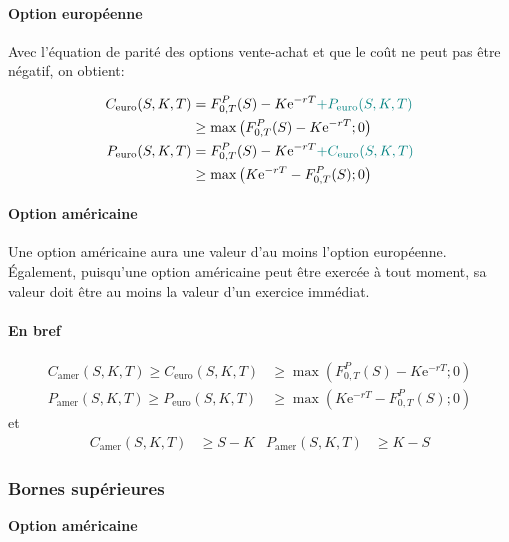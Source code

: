 \documentclass[10pt, french]{article}
\begin{document}
\begin{multicols*}{2}
\paragraph{Option européenne}	Avec l'équation de parité des options vente-achat et que le coût ne peut pas être négatif, on obtient:

\begin{align*}
	C_{\text{euro}}(S, K, T)	
	&=	F_{0, T}^{P}(S) - K\textrm{e}^{-rT} \textcolor{teal}{+ P_{\text{euro}}(S, K, T)}	\\
	&\geq	\max\left(F_{0, T}^{P}(S) - K\textrm{e}^{-rT}; 0\right)	\\
	P_{\text{euro}}(S, K, T)	
	&=	F_{0, T}^{P}(S) - K\textrm{e}^{-rT} \textcolor{teal}{+ C_{\text{euro}}(S, K, T)}	\\
	&\geq	\max\left(K\textrm{e}^{-rT} - F_{0, T}^{P}(S); 0\right)
\end{align*}

\paragraph{Option américaine}	Une option américaine aura une valeur d'au moins l'option européenne. Également, puisqu'une option américaine peut être exercée à tout moment, sa valeur doit être au moins la valeur d'un exercice immédiat.

\paragraph{En bref}
\begin{rappel_enhanced}
\begin{align*}
	C_{\text{amer}}(S, K, T)	\geq
	C_{\text{euro}}(S, K, T)	
	&\geq	\max\left(F_{0, T}^{P}(S) - K\textrm{e}^{-rT}; 0\right)	\\
	P_{\text{amer}}(S, K, T)	\geq
	P_{\text{euro}}(S, K, T)	
	&\geq	\max\left(K\textrm{e}^{-rT} - F_{0, T}^{P}(S); 0\right)
\end{align*}
et
\begin{align*}
	C_{\text{amer}}(S, K, T)	
	&\geq	S - K	&
	P_{\text{amer}}(S, K, T)
	&\geq	K - S
\end{align*}
\end{rappel_enhanced}

\subsubsection*{Bornes supérieures}
\begin{center}
	\textbf{Option américaine}
\end{center}


\end{multicols*}
\end{document}
